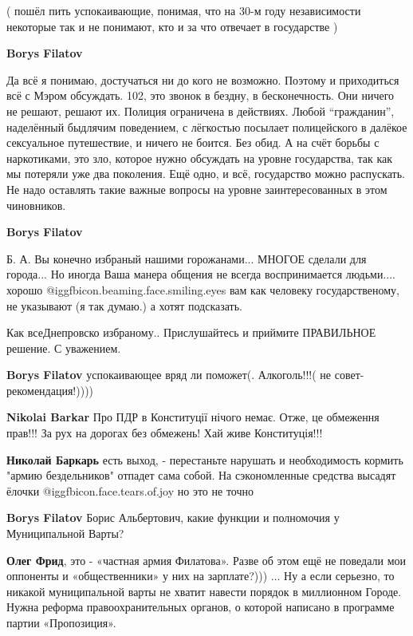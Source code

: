 \begin{itemize}
\begin{itemize}
( пошёл пить успокаивающие, понимая, что на 30-м году независимости некоторые
так и не понимают, кто и за что отвечает в государстве )


\textbf{Borys Filatov} 

Да всё я понимаю, достучаться ни до кого не возможно. Поэтому и приходиться всё
с Мэром обсуждать. 102, это звонок в бездну, в бесконечность. Они ничего не
решают, решают их. Полиция ограничена в действиях. Любой \enquote{гражданин},
наделённый быдлячим поведением, с лёгкостью посылает полицейского в далёкое
сексуальное путешествие, и ничего не боится. Без обид. А на счёт борьбы с
наркотиками, это зло, которое нужно обсуждать на уровне государства, так как мы
потеряли уже два поколения. Ещё одно, и всё, государство можно распускать. Не
надо оставлять такие важные вопросы на уровне заинтересованных в этом
чиновников.

\textbf{Borys Filatov} 

Б. А. Вы конечно избраный нашими горожанами... МНОГОЕ сделали для города... Но
иногда Ваша манера общения не всегда воспринимается людьми.... хорошо
@igg{fbicon.beaming.face.smiling.eyes}  вам как человеку государственому, не
указывают (я так думаю.) а хотят подсказать.

Как всеДнепровско избраному.. Прислушайтесь и приймите ПРАВИЛЬНОЕ решение.
С уважением.

\textbf{Borys Filatov} успокаивающее вряд ли поможет(. Алкоголь!!!( не совет- рекомендация!))))

\textbf{Nikolai Barkar} Про ПДР в Конституції нічого немає. Отже, це обмеження прав!!! За рух на дорогах без обмежень! Хай живе Конституція!!!

\textbf{Николай Баркарь} есть выход, - перестаньте нарушать и необходимость кормить "армию бездельников" отпадет сама собой. На сэкономленные средства высадят ёлочки  @igg{fbicon.face.tears.of.joy}  но это не точно

\textbf{Borys Filatov} Борис Альбертович, какие функции и полномочия у Муниципальной Варты?

\textbf{Олег Фрид}, это - «частная армия Филатова».
Разве об этом ещё не поведали мои оппоненты и «общественники» у них на зарплате?)))
...
Ну а если серьезно, то никакой муниципальной варты не хватит навести порядок в миллионном Городе. Нужна реформа правоохранительных органов, о которой написано в программе партии «Пропозиция».


\end{itemize}
\end{itemize}
